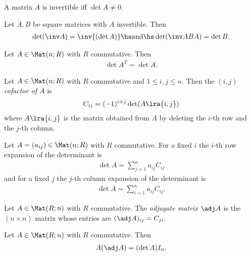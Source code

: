 \documentclass{article}
\begin{document}
\begin{theorem}[Notes 4.4.2]
	A matrix $A$ is invertible iff $\det A \not= 0$.
\end{theorem}

\begin{corollary}
	Let $A,B$ be square matrices with $A$ invertible. Then
	\begin{align*}
		\det (\inv A) = \inv{(\det A)} \hs\text{and}\hs
		\det (\inv ABA) = \det B.
	\end{align*}
\end{corollary}

\begin{lemma}[Notes 4.4.4]
	Let $A\in\Mat(n;R)$ with $R$ commutative. Then
	\begin{align*}
		\det A^T = \det A.
	\end{align*}
\end{lemma}

\begin{definition}
	Let $A\in\Mat(n;R)$ with $R$ commutative and $1\leq i,j\leq n$.  Then the \emph{$(i,j)$ cofactor of $A$} is
	\begin{align*}
		C_{ij}=(-1)^{i+j}\det(A\lra{i,j})
	\end{align*}
	where $A\lra{i,j}$ is the matrix obtained from $A$ by deleting the $i$-th row and the $j$-th column.
\end{definition}

\begin{theorem}[Notes 4.4.7]
	Let $A=(a_{ij})\in\Mat(n; R)$ with $R$ commutative. For a fixed $i$ the $i$-th row expansion
	of the determinant is
	\begin{align*}
		\det A = \sum_{j=1}^n a_{ij}C_{ij}
	\end{align*}
	and for a fixed $j$ the $j$-th column expansion of the determinant is
	\begin{align*}
		\det A = \sum_{i=1}^n a_{ij}C_{ij}.
	\end{align*}
\end{theorem}

\begin{definition}
	Let $A\in\Mat(R;n)$ with $R$ commutative. The \emph{adjugate matrix $\adj A$} is the
	$(n\times n)$ matrix whose entries are $(\adj A)_{ij} = C_{ji}$.
\end{definition}

\begin{theorem}
	Let $A\in\Mat(R;n)$ with $R$ commutative. Then
	\begin{align*}
		A(\adj A) = (\det A)I_n.
	\end{align*}
\end{theorem}
\end{document}
